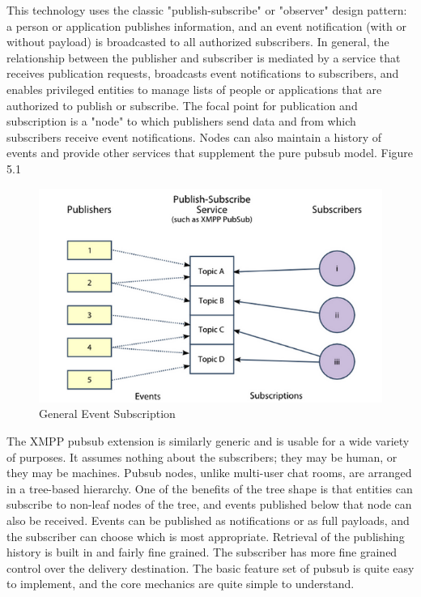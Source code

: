 This technology uses the classic "publish-subscribe" or "observer" design pattern: a person or application publishes information, and an event notification (with or without payload) is broadcasted to all authorized subscribers. In general, the relationship between the publisher and subscriber is mediated by a service that receives publication requests, broadcasts event notifications to subscribers, and enables privileged entities to manage lists of people or applications that are authorized to publish or subscribe. The focal point for publication and subscription is a "node" to which publishers send data and from which subscribers receive event notifications. Nodes can also maintain a history of events and provide other services that supplement the pure pubsub model. Figure 5.1
\begin{figure}[!ht]
    \centering
    \includegraphics[scale=0.8]{images/XEP0049.png}   
    \caption[General Event Subscription]{General Event Subscription}                      
    \end{figure}

The XMPP pubsub extension is similarly generic and is usable for a wide variety of purposes. It assumes nothing about the subscribers; they may be human, or they may be machines. Pubsub nodes, unlike multi-user chat rooms, are arranged in a tree-based hierarchy. One of the benefits of the tree shape is that entities can subscribe to non-leaf nodes of the tree, and events published below that node can also be received. Events can be published as notifications or as full payloads, and the subscriber can choose which is most appropriate. 
Retrieval of the publishing history is built in and fairly fine grained. The subscriber has more fine grained control over the delivery destination. The basic feature set of pubsub is quite easy to implement, and the core mechanics are quite simple to understand.
   
